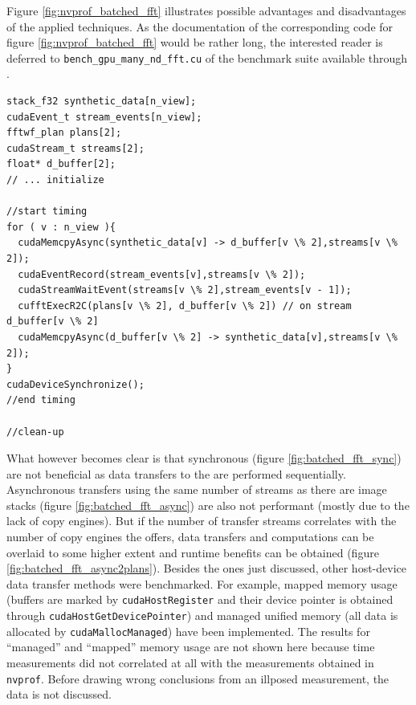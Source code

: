 Figure \ref{fig:nvprof_batched_fft} illustrates possible advantages and disadvantages of the applied techniques. As the documentation of the corresponding code for figure \ref{fig:nvprof_batched_fft} would be rather long, the interested reader is deferred to \texttt{bench\_gpu\_many\_nd\_fft.cu} of the \lmvn{} benchmark suite available through \cite{lmvn_repo}. 

\begin{lstlisting}[caption={Asynchronous Batched FFT on synthetic data performed on GPU in pseudo-code based on the \cufft{} syntax.},label={lst:batched_fft_gpu_async2plans}]
stack_f32 synthetic_data[n_view];
cudaEvent_t stream_events[n_view];
fftwf_plan plans[2];
cudaStream_t streams[2];
float* d_buffer[2];
// ... initialize 

//start timing
for ( v : n_view ){
  cudaMemcpyAsync(synthetic_data[v] -> d_buffer[v \% 2],streams[v \% 2]);
  cudaEventRecord(stream_events[v],streams[v \% 2]);
  cudaStreamWaitEvent(streams[v \% 2],stream_events[v - 1]);
  cufftExecR2C(plans[v \% 2], d_buffer[v \% 2]) // on stream d_buffer[v \% 2]
  cudaMemcpyAsync(d_buffer[v \% 2] -> synthetic_data[v],streams[v \% 2]);
}
cudaDeviceSynchronize();
//end timing

//clean-up
\end{lstlisting}


What however becomes clear is that synchronous (figure \ref{fig:batched_fft_sync}) are not beneficial as data transfers to the \gpu{} are performed sequentially. Asynchronous transfers using the same number of streams as there are image stacks (figure \ref{fig:batched_fft_async}) are also not performant (mostly due to the lack of copy engines). But if the number of transfer streams correlates with the number of copy engines the \gpu{} offers, data transfers and computations can be overlaid to some higher extent and runtime benefits can be obtained (figure \ref{fig:batched_fft_async2plans}). Besides the ones just discussed, other host-device data transfer methods were benchmarked. 
For example, mapped memory usage (buffers are marked by \texttt{cudaHostRegister} and their device pointer is obtained through \texttt{cudaHostGetDevicePointer}) and managed unified memory (all data is allocated by \texttt{cudaMallocManaged}) have been implemented. The results for ``managed'' and ``mapped'' memory usage are not shown here because time measurements did not correlated at all with the measurements obtained in \texttt{nvprof}. Before drawing wrong conclusions from an illposed measurement, the data is not discussed. 

